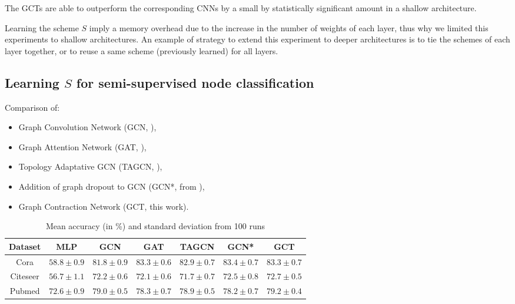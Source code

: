 The GCTs are able to outperform the corresponding CNNs by a small by statistically significant amount in a shallow architecture.

Learning the scheme $S$ imply a memory overhead due to the increase in the number of weights of each layer, thus why we limited this experiments to shallow architectures. An example of strategy to extend this experiment to deeper architectures is to tie the schemes of each layer together, or to reuse a same scheme (previously learned) for all layers.


\subsection{Learning $S$ for semi-supervised node classification}
\label{sec:lss}


  Comparison of:
  \begin{itemize}
   \item Graph Convolution Network (GCN, \cite{kipf2016semi}),
   \item Graph Attention Network (GAT, \cite{velickovic2017graph}),
   \item Topology Adaptative GCN (TAGCN,  \cite{du2017topology}),
   \item Addition of graph dropout to GCN (GCN*, from ),
   \item Graph Contraction Network (GCT, this work).
  \end{itemize}

  \begin{table}[H]
  \begin{center}
    \bgroup
    \def\arraystretch{1.5}%
    \begin{tabular}{|c|c|c|c|c|c|c|}
      \hline
      Dataset & MLP & GCN & GAT & TAGCN & GCN* & GCT\\
      \hline
      \hline
      Cora & $58.8 \pm 0.9$ & $81.8 \pm 0.9$ & $83.3 \pm 0.6$ & $82.9 \pm 0.7$ & $\mathbf{83.4} \pm 0.7$ & $83.3 \pm 0.7$\\
      \hline
      Citeseer & $56.7 \pm 1.1$ & $72.2 \pm 0.6$ & $72.1 \pm 0.6$ & $71.7 \pm 0.7$ & $72.5 \pm 0.8$ & $\mathbf{72.7} \pm 0.5$\\
      \hline
      Pubmed & $72.6 \pm 0.9$ & $79.0 \pm 0.5$ & $78.3 \pm 0.7$ & $78.9 \pm 0.5$ & $78.2 \pm 0.7$ & $\mathbf{79.2} \pm 0.4$\\
      \hline
    \end{tabular}
    \egroup
  \end{center}
  \caption{Mean accuracy (in \%) and standard deviation from 100 runs}
  \label{tab:lss}
  \end{table}

